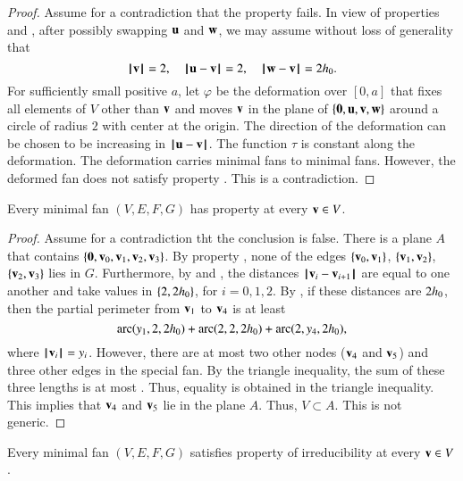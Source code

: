 \begin{proof}  Assume for a contradiction that the property fails.  In view of properties  and , after possibly swapping ${\mathbf u}$ and ${\mathbf w}$, we may assume without loss of generality that
$$
{{\hskip0.1em|\hskip-0.15em|\hskip0.1em}{\mathbf v}{\hskip0.1em|\hskip-0.15em|\hskip0.1em}}=2,\quad {\hskip0.1em|\hskip-0.15em|\hskip0.1em}{\mathbf u} - {\mathbf v}{\hskip0.1em|\hskip-0.15em|\hskip0.1em}=2,\quad {\hskip0.1em|\hskip-0.15em|\hskip0.1em}{\mathbf w} - {\mathbf v}{\hskip0.1em|\hskip-0.15em|\hskip0.1em}=2{h_0}.
$$
For sufficiently small positive $a$, let $\varphi$ be the deformation over $[0,a]$
that fixes all elements of $V$ other than ${\mathbf v}$ and moves ${\mathbf v}$ in the plane of
$\{{\mathbf 0},{\mathbf u},{\mathbf v},{\mathbf w}\}$ around a circle of radius $2$ with center at the origin.  The direction of the deformation can be chosen to be increasing in ${\hskip0.1em|\hskip-0.15em|\hskip0.1em}{\mathbf u} - {\mathbf v}{\hskip0.1em|\hskip-0.15em|\hskip0.1em}$.  The function $\tau$ is constant along the deformation.  The deformation carries minimal fans to minimal fans.  However, the deformed fan does not satisfy property .  This is a contradiction.
\end{proof}




\begin{lemma}  Every minimal fan $(V,E,F,G)$ has property  at every ${\mathbf v}\in V$.
\end{lemma}

\begin{proof} %
Assume for a contradiction tht the conclusion is false.  There is a plane $A$ that contains $\{{\mathbf 0},{\mathbf v}_0,{\mathbf v}_1,{\mathbf v}_2,{\mathbf v}_3\}$.
By property , none of the edges $\{{\mathbf v}_0,{\mathbf v}_1\}$, $\{{\mathbf v}_1,{\mathbf v}_2\}$, $\{{\mathbf v}_2,{\mathbf v}_3\}$ lies in $G$.  Furthermore, by  and , the distances ${\hskip0.1em|\hskip-0.15em|\hskip0.1em}{\mathbf v}_i - {\mathbf v}_{i+1}{\hskip0.1em|\hskip-0.15em|\hskip0.1em}$ are equal to one another and take values in $\{2,2{h_0}\}$, for $i=0,1,2$.  
By , if these distances are $2{h_0}$, then the partial perimeter from ${\mathbf v}_1$ to ${\mathbf v}_4$ is at least
\begin{equation}\label{eqn:3side}
\operatorname{arc}(y_1,2,2{h_0})+\operatorname{arc}(2,2,2{h_0})+\operatorname{arc}(2,y_4,2{h_0}),
\end{equation}
where ${{\hskip0.1em|\hskip-0.15em|\hskip0.1em}{\mathbf v}_i{\hskip0.1em|\hskip-0.15em|\hskip0.1em}}=y_i$.
However, there are at most two other nodes (${\mathbf v}_4$ and ${\mathbf v}_5$) and three other edges in the special fan.  By the triangle inequality, the sum of these three lengths is at most .
Thus, equality is obtained in the triangle inequality.  This implies that ${\mathbf v}_4$ and ${\mathbf v}_5$ lie in the plane $A$.  Thus, $V\subset A$.   This is not generic.
\end{proof}

\begin{lemma} 
Every minimal fan $(V,E,F,G)$ satisfies property  of irreducibility at every ${\mathbf v}\in V$.
\end{lemma}

